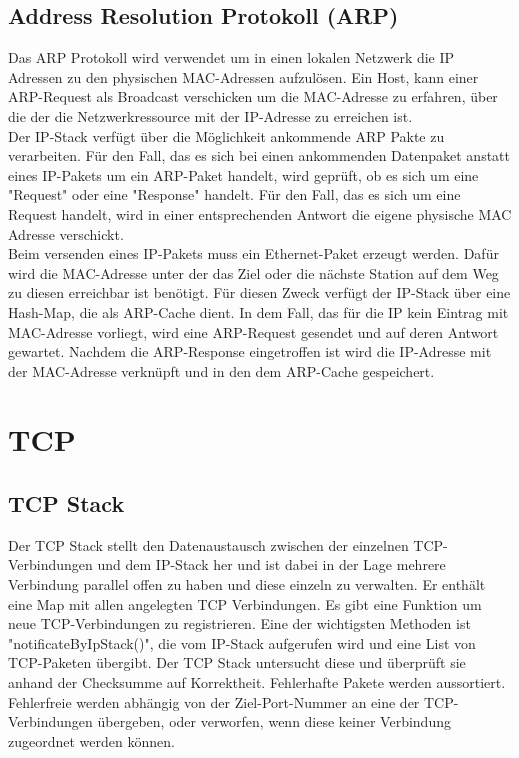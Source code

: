 \subsection{Address Resolution Protokoll (ARP)}
Das ARP Protokoll wird verwendet um in einen lokalen Netzwerk die IP Adressen zu den physischen MAC-Adressen aufzulösen. Ein Host, kann einer ARP-Request als Broadcast verschicken um die MAC-Adresse zu erfahren, über die der die Netzwerkressource mit der IP-Adresse zu erreichen ist. \\

Der IP-Stack verfügt über die Möglichkeit ankommende ARP Pakte zu verarbeiten. Für den Fall, das es sich bei einen ankommenden Datenpaket anstatt eines IP-Pakets um ein ARP-Paket handelt, wird geprüft, ob es sich um eine {}"Request"{} oder eine {}"Response"{} handelt. Für den Fall, das es sich um eine Request handelt, wird in einer entsprechenden Antwort die eigene physische MAC Adresse verschickt. \\

Beim versenden eines IP-Pakets muss ein Ethernet-Paket erzeugt werden. Dafür wird die MAC-Adresse unter der das Ziel oder die nächste Station auf dem Weg zu diesen erreichbar ist benötigt. Für diesen Zweck verfügt der IP-Stack über eine Hash-Map, die als ARP-Cache dient. In dem Fall, das für die IP kein Eintrag mit MAC-Adresse vorliegt, wird eine ARP-Request gesendet und auf deren Antwort gewartet. Nachdem die ARP-Response eingetroffen ist wird die IP-Adresse mit der MAC-Adresse verknüpft und in den dem ARP-Cache gespeichert. 






\section{TCP}

\subsection{TCP Stack}
Der TCP Stack stellt den Datenaustausch zwischen der einzelnen TCP-Verbindungen und dem IP-Stack her und ist dabei in der Lage mehrere Verbindung parallel offen zu haben und diese einzeln zu verwalten. 
Er enthält eine Map mit allen angelegten TCP Verbindungen. Es gibt eine Funktion um neue TCP-Verbindungen zu registrieren. Eine der wichtigsten Methoden ist "notificateByIpStack()", die vom IP-Stack aufgerufen wird und eine List von TCP-Paketen übergibt. Der TCP Stack untersucht diese und überprüft sie anhand der Checksumme auf Korrektheit. Fehlerhafte Pakete werden aussortiert. Fehlerfreie werden abhängig von der Ziel-Port-Nummer an eine der TCP-Verbindungen übergeben, oder verworfen, wenn diese keiner Verbindung zugeordnet werden können.   

